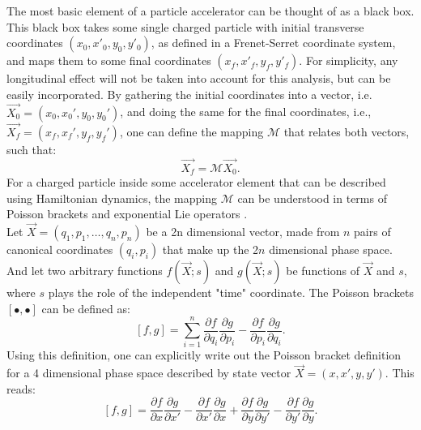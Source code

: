 The most basic element of a particle accelerator can be thought of as a black box. This black box takes some single charged particle with initial transverse coordinates $\left( x_0,x'_0,y_0,y'_0 \right)$, as defined in a Frenet-Serret coordinate system, and maps them to some final coordinates $\left( x_f,x'_f,y_f,y'_f \right)$. For simplicity, any longitudinal effect will not be taken into account for this analysis, but can be easily incorporated. By gathering the initial coordinates into a vector, i.e. $\vec{X_0} = \left( x_0,x_0',y_0,y_0' \right)$, and doing the same for the final coordinates, i.e., $\vec{X_f} = \left( x_f,x_f',y_f,y_f' \right)$, one can define the mapping $\mathcal{M}$ that relates both vectors, such that:  
\begin{equation}
\label{eq:ch1map}
\vec{X_f}=\mathcal{M}\vec{X_0}.
\end{equation}
For a charged particle inside some accelerator element that can be described using Hamiltonian dynamics, the mapping $\mathcal{M}$ can be understood in terms of Poisson brackets and exponential Lie operators \cite{wolski,todd1,cernthesis1,cernthesis2}.\\
Let $\vec{X} = \left( q_1,p_1,\dots,q_{n},p_{n} \right)$ be a 2n dimensional vector, made from $n$ pairs of canonical coordinates $(q_i,p_i)$ that make up the 2$n$ dimensional phase space. And let two arbitrary functions $f\left( \vec{X};s\right)$ and $g\left( \vec{X};s\right)$ be functions of $\vec{X}$ and $s$, where $s$ plays the role of the independent "time" coordinate. The Poisson brackets $\left[ \bullet , \bullet \right]$ can be defined as:
\begin{equation}
    \label{eq:ch1poisson}
    \left[ f,g \right] = \sum_{i=1}^{n} \frac{\partial f}{\partial q_i}\frac{\partial g}{\partial p_i} - \frac{\partial f}{\partial p_i}\frac{\partial g}{\partial q_i}. 
\end{equation}
Using this definition, one can explicitly write out the Poisson bracket definition for a 4 dimensional phase space described by state vector $\vec{X} = \left( x,x',y,y' \right)$. This reads: 
\begin{equation}
    \label{eq:ch1poisson1}
    \left[ f,g \right] = \frac{\partial f}{\partial x}\frac{\partial g}{\partial x'} - \frac{\partial f}{\partial x'}\frac{\partial g}{\partial x} + \frac{\partial f}{\partial y}\frac{\partial g}{\partial y'} - \frac{\partial f}{\partial y'}\frac{\partial g}{\partial y}. 
\end{equation}\\
